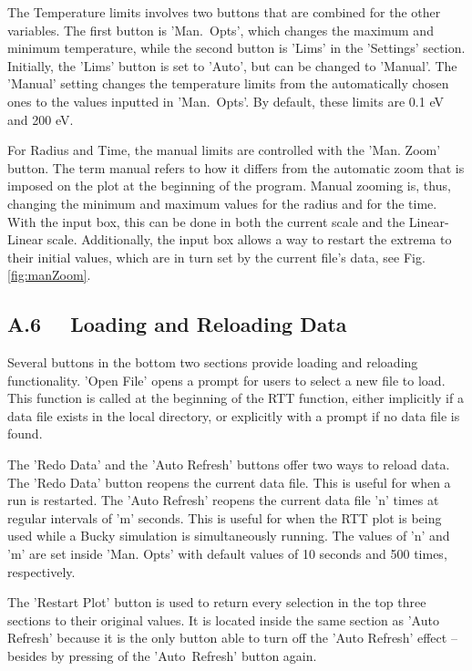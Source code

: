 The Temperature limits involves two buttons that are combined for the other variables.  The first button is \mbox{'Man. Opts'}, which changes the maximum and minimum temperature, while the second button is 'Lims' in the 'Settings' section.  Initially, the 'Lims' button is set to 'Auto', but can be changed to 'Manual'.  The 'Manual' setting changes the temperature limits from the automatically chosen ones to the values inputted in \mbox{'Man. Opts'}.  By default, these limits are 0.1 eV and 200 eV.

For Radius and Time, the manual limits are controlled with the 'Man. Zoom' button.  The term manual refers to how it differs from the automatic zoom that is imposed on the plot at the beginning of the program.  Manual zooming is, thus, changing the minimum and maximum values for the radius and for the time.  With the input box, this can be done in both the current scale and the Linear-Linear scale.  Additionally, the input box allows a way to restart the extrema to their initial values, which are in turn set by the current file's data, see Fig.\,\ref{fig:manZoom}.

\subsection{A.6 \ \ Loading and Reloading Data }

Several buttons in the bottom two sections provide loading and reloading functionality.  'Open File' opens a prompt for users to select a new file to load.  This function is called at the beginning of the RTT function, either implicitly if a data file exists in the local directory, or explicitly with a prompt if no data file is found.  

The 'Redo Data' and the 'Auto Refresh' buttons offer two ways to reload data.  The 'Redo Data' button reopens the current data file.  This is useful for when a run is restarted.  The 'Auto Refresh' reopens the current data file 'n' times at regular intervals of 'm' seconds.  This is useful for when the RTT plot is being used while a Bucky simulation is simultaneously running.  The values of 'n' and 'm' are set inside 'Man. Opts' with default values of 10 seconds and 500 times, respectively.

The 'Restart Plot' button is used to return every selection in the top three sections to their original values. It is located inside the same section as  'Auto Refresh' because it is the only button able to turn off the 'Auto Refresh' effect -- besides by pressing of the \mbox{'Auto Refresh'} button again.  


